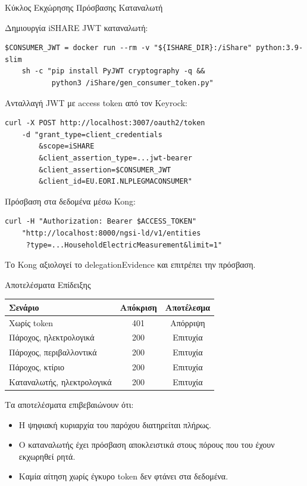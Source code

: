 \documentclass[11pt]{beamer}
\newcommand{\en}[1]{\foreignlanguage{english}{#1}}
\begin{document}
\begin{frame}[fragile]{Κύκλος Εκχώρησης Πρόσβασης Καταναλωτή}

Δημιουργία \en{iSHARE JWT} καταναλωτή:
\begin{lstlisting}
$CONSUMER_JWT = docker run --rm -v "${ISHARE_DIR}:/iShare" python:3.9-slim
    sh -c "pip install PyJWT cryptography -q &&
           python3 /iShare/gen_consumer_token.py"
\end{lstlisting}

Ανταλλαγή \en{JWT} με \en{access token} από τον \en{Keyrock}:
\begin{lstlisting}
curl -X POST http://localhost:3007/oauth2/token
    -d "grant_type=client_credentials
        &scope=iSHARE
        &client_assertion_type=...jwt-bearer
        &client_assertion=$CONSUMER_JWT
        &client_id=EU.EORI.NLPLEGMACONSUMER"
\end{lstlisting}

Πρόσβαση στα δεδομένα μέσω \en{Kong}:
\begin{lstlisting}
curl -H "Authorization: Bearer $ACCESS_TOKEN"
    "http://localhost:8000/ngsi-ld/v1/entities
     ?type=...HouseholdElectricMeasurement&limit=1"
\end{lstlisting}
Το \en{Kong} αξιολογεί το \en{delegationEvidence} και επιτρέπει την πρόσβαση.
\end{frame}

\begin{frame}{Αποτελέσματα Επίδειξης}
\begin{table}
\centering
\small
\begin{tabular}{lcc}
\toprule
\textbf{Σενάριο} & \textbf{Απόκριση} & \textbf{Αποτέλεσμα} \\
\midrule
Χωρίς \en{token} & \en{401} & Απόρριψη \\
Πάροχος, ηλεκτρολογικά & \en{200} & Επιτυχία \\
Πάροχος, περιβαλλοντικά & \en{200} & Επιτυχία \\
Πάροχος, κτίριο & \en{200} & Επιτυχία \\
Καταναλωτής, ηλεκτρολογικά & \en{200} & Επιτυχία \\
\bottomrule
\end{tabular}
\end{table}
\bigskip

Τα αποτελέσματα επιβεβαιώνουν ότι:
\begin{itemize}
    \item Η ψηφιακή κυριαρχία του παρόχου διατηρείται πλήρως.
    \item Ο καταναλωτής έχει πρόσβαση αποκλειστικά στους
    πόρους που του έχουν εκχωρηθεί ρητά.
    \item Καμία αίτηση χωρίς έγκυρο \en{token} δεν φτάνει στα
    δεδομένα.
\end{itemize}
\end{frame}
\end{document}
